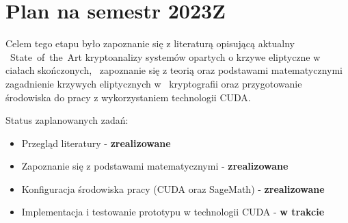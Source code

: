 \newpage %
\section{Plan na semestr 2023Z}
Celem tego etapu było zapoznanie się z literaturą opisującą aktualny \
State~of~the~Art kryptoanalizy systemów opartych o krzywe eliptyczne w ciałach skończonych, \
zapoznanie się z teorią oraz podstawami matematycznymi zagadnienie krzywych eliptycznych w \
kryptografii oraz przygotowanie środowiska do pracy z wykorzystaniem technologii CUDA. \
\newline

\indent
Status zaplanowanych zadań:
\begin{itemize}
    \item Przegląd literatury - \textbf{zrealizowane}
    \item Zapoznanie się z podstawami matematycznymi - \textbf{zrealizowane}
    \item Konfiguracja środowiska pracy (CUDA oraz SageMath) - \textbf{zrealizowane}
    \item Implementacja i testowanie prototypu w technologii CUDA - \textbf{w trakcie}
\end{itemize}
